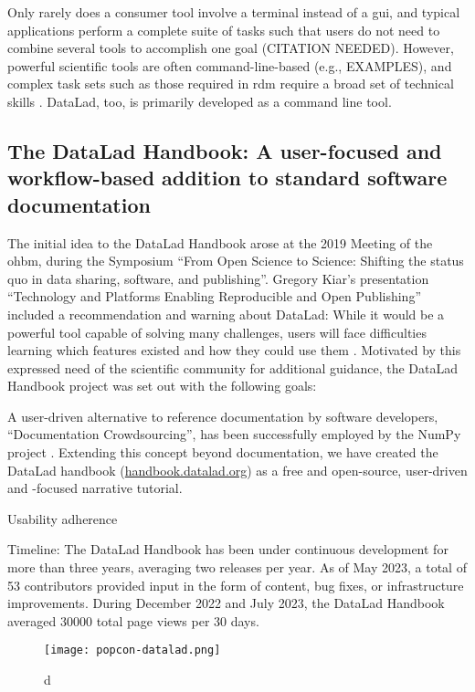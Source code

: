 Only rarely does a consumer tool involve a terminal instead of a \gls{gui}, and typical applications perform a complete suite of tasks such that users do not need to combine several tools to accomplish one goal (CITATION NEEDED).
However, powerful scientific tools are often command-line-based (e.g., EXAMPLES), and complex task sets such as those required in \gls{rdm} require a broad set of technical skills \citep{grisham2016proposed}.
DataLad, too, is primarily developed as a command line tool.

\pagebreak

\subsection{The DataLad Handbook: A user-focused and workflow-based addition to standard software documentation}

The initial idea to the DataLad Handbook arose at the 2019 Meeting of the \gls{ohbm}, during the Symposium ``From Open Science to Science: Shifting the status quo in data sharing, software, and publishing''.
Gregory Kiar's presentation ``Technology and Platforms Enabling Reproducible and Open Publishing'' included a recommendation and warning about DataLad: While it would be a powerful tool capable of solving many challenges, users will face difficulties learning which features existed and how they could use them \citep{kiar}.
Motivated by this expressed need of the scientific community for additional guidance, the DataLad Handbook project was set out with the following goals:



A user-driven alternative to reference documentation by software developers, ``Documentation Crowdsourcing'', has been successfully employed by the NumPy project \citep{pawlik2014crowdsourcing}.
Extending this concept beyond documentation, we have created the DataLad handbook (\href{http://handbook.datalad.org}{handbook.datalad.org}) as a free and open-source, user-driven and -focused narrative tutorial.



Usability adherence

Timeline:
The DataLad Handbook has been under continuous development for more than three years, averaging two releases per year.
As of May 2023, a total of 53 contributors provided input in the form of content, bug fixes, or infrastructure improvements.
During December 2022 and July 2023, the DataLad Handbook averaged 30000 total page views per 30 days.


\begin{figure}
	\texttt{[image: popcon-datalad.png]}
	\caption{d}
	\label{fig:popcon}
\end{figure}

\pagebreak

